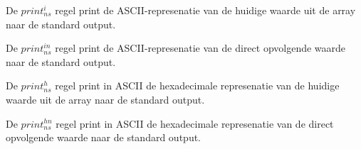 \documentclass[11pt]{article}
\begin{document}
De $print^i_{ns}$ regel print de ASCII-represenatie van de huidige waarde uit de array naar de standard output.
\begin{prooftree}
\end{prooftree}

De $print^{in}_{ns}$ regel print de ASCII-represenatie van de direct opvolgende waarde naar de standard output.
\begin{prooftree}
\end{prooftree}

De $print^h_{ns}$ regel print in ASCII de hexadecimale represenatie van de huidige waarde uit de array naar de standard output.
\begin{prooftree}
\end{prooftree}

De $print^{hn}_{ns}$ regel print in ASCII de hexadecimale represenatie van de direct opvolgende waarde naar de standard output.
\begin{prooftree}
\end{prooftree}




%
\end{document}
